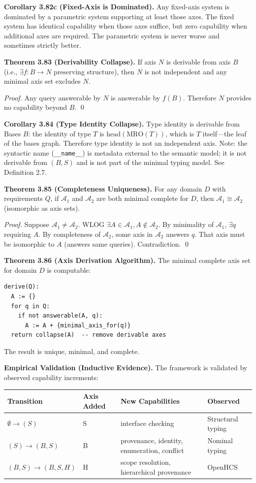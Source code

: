 \textbf{Corollary 3.82c (Fixed-Axis is Dominated).} Any fixed-axis system is dominated by a parametric system supporting at least those axes. The fixed system has identical capability when those axes suffice, but zero capability when additional axes are required. The parametric system is never worse and sometimes strictly better.

\textbf{Theorem 3.83 (Derivability Collapse).} If axis $N$ is derivable from axis $B$ (i.e., $\exists f: B \to N$ preserving structure), then $N$ is not independent and any minimal axis set excludes $N$.

\emph{Proof.} Any query answerable by $N$ is answerable by $f(B)$. Therefore $N$ provides no capability beyond $B$. \qed

\textbf{Corollary 3.84 (Type Identity Collapse).} Type identity is derivable from Bases $B$: the identity of type $T$ is $\text{head}(\text{MRO}(T))$, which is $T$ itself---the leaf of the bases graph. Therefore type identity is not an independent axis. Note: the syntactic name (\texttt{\_\_name\_\_}) is metadata external to the semantic model; it is not derivable from $(B, S)$ and is not part of the minimal typing model. See Definition 2.7.

\textbf{Theorem 3.85 (Completeness Uniqueness).} For any domain $D$ with requirements $Q$, if $\mathcal{A}_1$ and $\mathcal{A}_2$ are both minimal complete for $D$, then $\mathcal{A}_1 \cong \mathcal{A}_2$ (isomorphic as axis sets).

\emph{Proof.} Suppose $\mathcal{A}_1 \neq \mathcal{A}_2$. WLOG $\exists A \in \mathcal{A}_1, A \notin \mathcal{A}_2$. By minimality of $\mathcal{A}_1$, $\exists q$ requiring $A$. By completeness of $\mathcal{A}_2$, some axis in $\mathcal{A}_2$ answers $q$. That axis must be isomorphic to $A$ (answers same queries). Contradiction. \qed

\textbf{Theorem 3.86 (Axis Derivation Algorithm).} The minimal complete axis set for domain $D$ is computable:
\begin{verbatim}
derive(Q):
  A := {}
  for q in Q:
    if not answerable(A, q):
      A := A + {minimal_axis_for(q)}
  return collapse(A)  -- remove derivable axes
\end{verbatim}
The result is unique, minimal, and complete.

\textbf{Empirical Validation (Inductive Evidence).} The framework is validated by observed capability increments:

\begin{center}
\begin{tabular}{llll}
\toprule
Transition & Axis Added & New Capabilities & Observed \\
\midrule
$\emptyset \to (S)$ & S & interface checking & Structural typing \\
$(S) \to (B,S)$ & B & provenance, identity, enumeration, conflict & Nominal typing \\
$(B,S) \to (B,S,H)$ & H & scope resolution, hierarchical provenance & OpenHCS \\
\bottomrule
\end{tabular}
\end{center}

